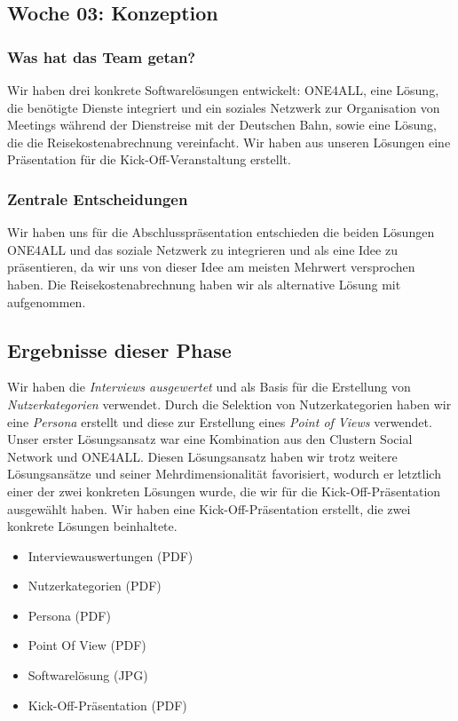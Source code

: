 \documentclass{article}
\begin{document}
\subsection{Woche 03: Konzeption}

\subsubsection{Was hat das Team getan?}

Wir haben drei konkrete Softwarel\"osungen entwickelt: ONE4ALL, eine L\"osung, die ben\"otigte Dienste integriert und ein soziales Netzwerk zur Organisation von Meetings w\"ahrend der Dienstreise mit der Deutschen Bahn, sowie eine L\"osung, die die Reisekostenabrechnung vereinfacht. Wir haben aus unseren L\"osungen eine Pr\"asentation f\"ur die Kick-Off-Veranstaltung erstellt.

\subsubsection{Zentrale Entscheidungen}

Wir haben uns f\"ur die Abschlusspr\"asentation entschieden die beiden L\"osungen ONE4ALL und das soziale Netzwerk zu integrieren und als eine Idee zu pr\"asentieren, da wir uns von dieser Idee am meisten Mehrwert versprochen haben. Die Reisekostenabrechnung haben wir als alternative L\"osung mit aufgenommen. 

\subsection{Ergebnisse dieser Phase}

Wir haben die \textit{Interviews ausgewertet} und als Basis f\"ur die Erstellung von \textit{Nutzerkategorien} verwendet. Durch die Selektion von Nutzerkategorien haben wir eine \textit{Persona} erstellt und diese zur Erstellung eines \textit{Point of Views} verwendet. Unser erster L\"osungsansatz war eine Kombination aus den Clustern Social Network und ONE4ALL. Diesen L\"osungsansatz haben wir trotz weitere L\"osungsans\"atze und seiner Mehrdimensionalit\"at favorisiert, wodurch er letztlich einer der zwei konkreten L\"osungen wurde, die wir f\"ur die Kick-Off-Pr\"asentation ausgew\"ahlt haben. Wir haben eine Kick-Off-Pr\"asentation erstellt, die zwei konkrete L\"osungen beinhaltete.

\begin{itemize}
\item Interviewauswertungen (PDF)
\item Nutzerkategorien (PDF)
\item Persona (PDF)
\item Point Of View (PDF)
\item Softwarel\"osung (JPG)
\item Kick-Off-Pr\"asentation (PDF)
\end{itemize}
\end{document}
